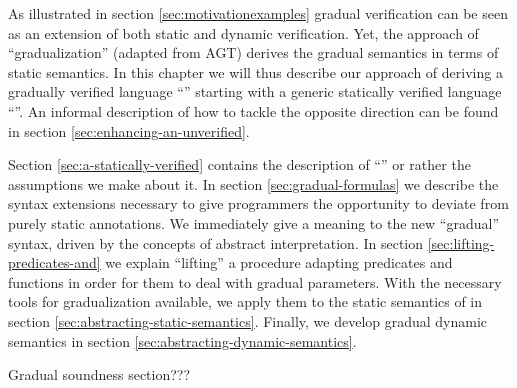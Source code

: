 As illustrated in section \ref{sec:motivationexamples} gradual verification can be seen as an extension of both static and dynamic verification.
Yet, the approach of “gradualization” (adapted from AGT) derives the gradual semantics in terms of static semantics.
In this chapter we will thus describe our approach of deriving a gradually verified language “{\gvl}” starting with a generic statically verified language “{\svl}”.
An informal description of how to tackle the opposite direction can be found in section \ref{sec:enhancing-an-unverified}.

Section \ref{sec:a-statically-verified} contains the description of “{\svl}” or rather the assumptions we make about it.
In section \ref{sec:gradual-formulas} we describe the syntax extensions necessary to give programmers the opportunity to deviate from purely static annotations.
We immediately give a meaning to the new “gradual” syntax, driven by the concepts of abstract interpretation.
In section \ref{sec:lifting-predicates-and} we explain “lifting” a procedure adapting predicates and functions in order for them to deal with gradual parameters.
With the necessary tools for gradualization available, we apply them to the static semantics of \svl in section \ref{sec:abstracting-static-semantics}.
Finally, we develop gradual dynamic semantics in section \ref{sec:abstracting-dynamic-semantics}.

Gradual soundness section???

